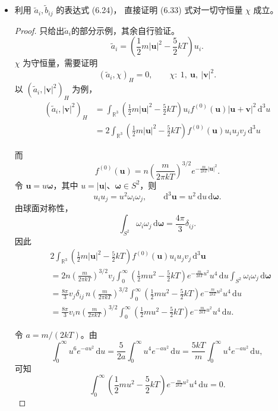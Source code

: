 \begin{itemize}
    \item[4.]利用 $\widetilde a_i,\widetilde b_{ij}$ 的表达式 (6.24)，
    直接证明 (6.33) 式对一切守恒量 $\chi$ 成立。

    \begin{proof}
        只给出$\widetilde a_i$的部分示例，其余自行验证。
    $$
    \widetilde a_i
    =\left(\frac{1}{2}m|\boldsymbol{u}|^2
    -\frac{5}{2}kT\right)u_i.
    $$
    $\chi$ 为守恒量，需要证明
    $$
    (\widetilde a_i,\chi)_H=0,
    \qquad
    \chi:\ 1,\ \boldsymbol{u},\ |\boldsymbol{v}|^2.
    $$
    以 $(\widetilde a_i,|\boldsymbol{v}|^2)_H$ 为例，
    $$
    \begin{aligned}
    (\widetilde a_i,|\boldsymbol{v}|^2)_H
    &=\int_{\mathbb R^3}
    \left(\frac{1}{2}m|\boldsymbol{u}|^2
    -\frac{5}{2}kT\right)
    u_i f^{(0)}(\boldsymbol{u})
    |\boldsymbol{u}+\boldsymbol{v}|^2
    \,\mathrm d^3u\\
    &=2\int_{\mathbb R^3}
    \left(\frac{1}{2}m|\boldsymbol{u}|^2
    -\frac{5}{2}kT\right)
    f^{(0)}(\boldsymbol{u})u_iu_jv_j
    \,\mathrm d^3u
    \end{aligned}
    $$

而
\[
f^{(0)}(\boldsymbol u)
=n\left(\frac{m}{2\pi kT}\right)^{3/2}
e^{-\frac{m}{2kT}|\boldsymbol u|^2}.
\]
令 \(\boldsymbol u=u\boldsymbol\omega\)，其中
\(u=|\boldsymbol u|\)、\(\boldsymbol\omega\in S^2\)，则
\[
u_i u_j=u^2\omega_i\omega_j,
\qquad
\mathrm d^3\boldsymbol u=u^2\,\mathrm du\,\mathrm d\boldsymbol\omega.
\]
由球面对称性，
\[
\int_{S^2}\omega_i\omega_j\,\mathrm d\boldsymbol\omega
=\frac{4\pi}{3}\delta_{ij}.
\]
因此
\[
\begin{aligned}
&2\int_{\mathbb R^3}
\left(\frac12m|\boldsymbol u|^2-\frac52kT\right)
f^{(0)}(\boldsymbol u)u_i u_jv_j\,\mathrm d^3\boldsymbol u\\
&=
2n\left(\frac{m}{2\pi kT}\right)^{3/2}v_j
\int_0^\infty
\left(\frac12mu^2-\frac52kT\right)
e^{-\frac{m}{2kT}u^2}u^4\,\mathrm du
\int_{S^2}\omega_i\omega_j\,\mathrm d\boldsymbol\omega\\
&=
\frac{8\pi}{3}v_j\delta_{ij}\,
n\left(\frac{m}{2\pi kT}\right)^{3/2}
\int_0^\infty
\left(\frac12mu^2-\frac52kT\right)
e^{-\frac{m}{2kT}u^2}u^4\,\mathrm du\\
&=
\frac{8\pi}{3}v_i n
\left(\frac{m}{2\pi kT}\right)^{3/2}
\int_0^\infty
\left(\frac12mu^2-\frac52kT\right)
e^{-\frac{m}{2kT}u^2}u^4\,\mathrm du.
\end{aligned}
\]

令 \(a=m/(2kT)\)。由
\[
\int_0^\infty u^6e^{-au^2}\,\mathrm du
=\frac{5}{2a}\int_0^\infty u^4e^{-au^2}\,\mathrm du
=\frac{5kT}{m}\int_0^\infty u^4e^{-au^2}\,\mathrm du,
\]
可知
\[
\int_0^\infty
\left(\frac12mu^2-\frac52kT\right)
e^{-\frac{m}{2kT}u^2}u^4\,\mathrm du=0.
\]
    \end{proof}


\end{itemize}
